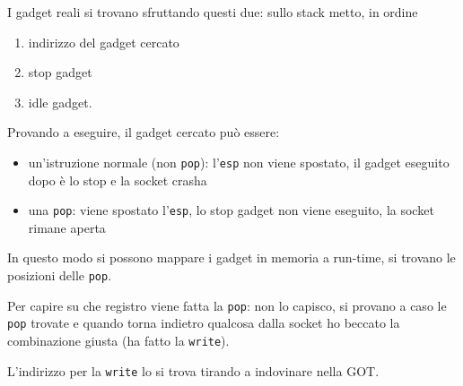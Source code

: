 I gadget reali si trovano sfruttando questi due: sullo stack metto, in ordine
\begin{enumerate}
	\item indirizzo del gadget cercato
	
    \item stop gadget
	
    \item idle gadget. 
\end{enumerate}

Provando a eseguire, il gadget cercato può essere:
\begin{itemize}
	\item un'istruzione normale (non \texttt{pop}): l'\texttt{esp} non viene spostato, il gadget eseguito dopo è lo stop e la socket crasha
    
	\item una \texttt{pop}: viene spostato l'\texttt{esp}, lo stop gadget non viene eseguito, la socket rimane aperta
\end{itemize}

In questo modo si possono mappare i gadget in memoria a run-time, si trovano le posizioni delle \texttt{pop}. 

Per capire su che registro viene fatta la \texttt{pop}: non lo capisco, si provano a caso le \texttt{pop} trovate e quando torna indietro qualcosa dalla socket ho beccato la combinazione giusta (ha fatto la \texttt{write}).

L'indirizzo per la \texttt{write} lo si trova tirando a indovinare nella GOT.

